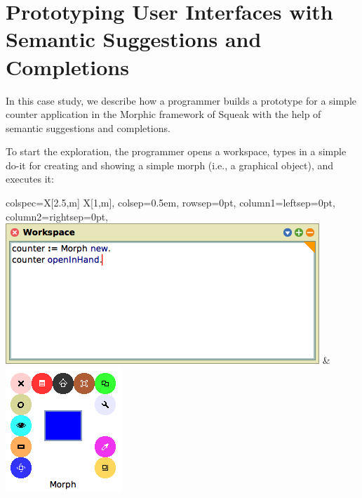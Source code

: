 
\section{Prototyping User Interfaces with Semantic Suggestions and Completions}
\label{sec:application/suggestions}

In this case study, we describe how a programmer builds a prototype for a simple counter application in the Morphic framework of Squeak with the help of semantic suggestions and completions.

To start the exploration, the programmer opens a workspace, types in a simple do-it for creating and showing a simple morph (i.e., a graphical object), and executes it:

\begin{center}
	\begin{tblr}{
		colspec={X[2.5,m] X[1,m]},
		colsep=0.5em,
		rowsep=0pt,
		column{1}={leftsep=0pt},
		column{2}={rightsep=0pt},
	}
		\includegraphics[width=\linewidth]{01_suggestions/workspace_start.png} & %
		\includegraphics[width=\linewidth]{01_suggestions/app_start.png} %

\end{tblr}
\end{center}
